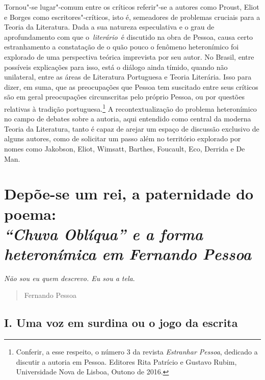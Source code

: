 Tornou"-se lugar"-comum entre os críticos referir"-se a autores como
Proust, Eliot e Borges como escritores"-críticos, isto é, semeadores de
problemas cruciais para a Teoria da Literatura. Dada a sua natureza
especulativa e o grau de aprofundamento com que o\emph{~literário}~é
discutido na obra de Pessoa, causa certo estranhamento a constatação de
o quão pouco o fenômeno heteronímico foi explorado de uma perspectiva
teórica imprevista por seu autor. No Brasil, entre possíveis explicações
para isso, está o diálogo ainda tímido, quando não unilateral, entre as
áreas de Literatura Portuguesa e Teoria Literária. Isso para dizer, em
suma, que as preocupações que Pessoa tem suscitado entre seus críticos
são em geral preocupações circunscritas pelo próprio Pessoa, ou por
questões relativas à tradição portuguesa.\footnote{Conferir, a esse
  respeito, o número 3 da revista \emph{Estranhar Pessoa}, dedicado a
  discutir a autoria em Pessoa. Editores Rita Patrício e Gustavo Rubim,
  Universidade Nova de Lisboa, Outono de 2016.} A recontextualização do
problema heteronímico no campo de debates sobre a autoria, aqui
entendido como central da moderna Teoria da Literatura, tanto é capaz de
arejar um espaço de discussão exclusivo de alguns autores, como de
solicitar um passo além no território explorado por nomes como Jakobson,
Eliot, Wimsatt, Barthes, Foucault, Eco, Derrida e De Man.

\chapter*{Depõe-se um rei, a paternidade do poema:\\ \emph{``Chuva Oblíqua'' e a forma heteronímica em Fernando Pessoa}}



\emph{Não sou eu quem descrevo. Eu sou a tela}.

\begin{quote}
Fernando Pessoa
\end{quote}

\section*{I. Uma voz em surdina ou o jogo da escrita}

